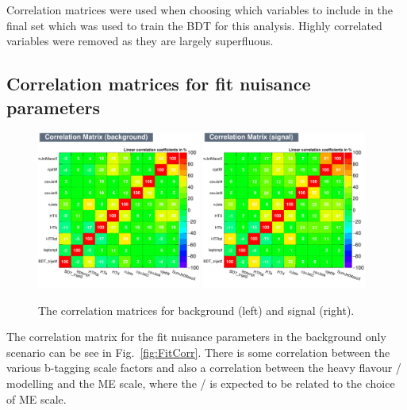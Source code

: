 Correlation matrices were used when choosing which variables to include in the final set which was used to train the BDT for this analysis. Highly correlated variables were removed as they are largely superfluous.

\subsection{Correlation matrices for fit nuisance parameters}


\begin{figure}[ht!]
    \includegraphics[width=0.48\textwidth]{images/Run2/CorrelationMatrixB.pdf}
    \includegraphics[width=0.48\textwidth]{images/Run2/CorrelationMatrixS.pdf}
    \caption{The correlation matrices for background (left) and signal (right).}
    \label{fig:corrMat}
\end{figure}

The correlation matrix for the fit nuisance parameters in the background only scenario can be see in Fig.~\ref{fig:FitCorr}. There is some correlation between the various b-tagging scale factors and also a correlation between the heavy flavour \heavyflavourone / \heavyflavourtwo modelling and the \ttbar ME scale, where the \heavyflavourone / \heavyflavourtwo is expected to be related to the choice of ME scale.

